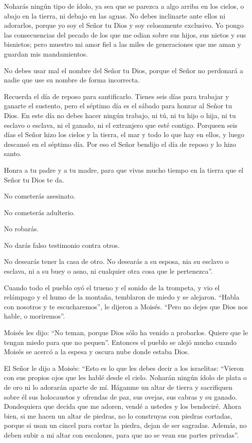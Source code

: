  Noharás ningún tipo de ídolo, ya sea que se parezca a algo
arriba en los cielos, o abajo en la tierra, ni debajo en las aguas.
 No debes inclinarte ante ellos ni adorarlos, porque yo soy
el Señor tu Dios y soy celosamente exclusivo. Yo pongo las consecuencias
del pecado de los que me odian sobre sus hijos, sus nietos y sus
bisnietos;  pero muestro mi amor fiel a las miles de
generaciones que me aman y guardan mis mandamientos.

 No debes usar mal el nombre del Señor tu Dios, porque el
Señor no perdonará a nadie que use su nombre de forma incorrecta.

 Recuerda el día de reposo para santificarlo. 
Tienes seis días para trabajar y ganarte el sustento,  pero
el séptimo día es el sábado para honrar al Señor tu Dios. En este día no
debes hacer ningún trabajo, ni tú, ni tu hijo o hija, ni tu esclavo o
esclava, ni el ganado, ni el extranjero que esté contigo. 
Porqueen seis días el Señor hizo los cielos y la tierra, el mar y todo
lo que hay en ellos, y luego descansó en el séptimo día. Por eso el
Señor bendijo el día de reposo y lo hizo santo.

 Honra a tu padre y a tu madre, para que vivas mucho tiempo
en la tierra que el Señor tu Dios te da.

 No cometerás asesinato.

 No cometerás adulterio.

 No robarás.

 No darás falso testimonio contra otros.

 No desearás tener la casa de otro. No desearás a su
esposa, nia su esclavo o esclava, ni a su buey o asno, ni cualquier otra
cosa que le pertenezca''.

 Cuando todo el pueblo oyó el trueno y el sonido de la
trompeta, y vio el relámpago y el humo de la montaña, temblaron de miedo
y se alejaron.  ``Habla con nosotros y te escucharemos'',
le dijeron a Moisés. ``Pero no dejes que Dios nos hable, o moriremos''.

 Moisés les dijo: ``No teman, porque Dios sólo ha venido a
probarlos. Quiere que le tengan miedo para que no pequen''.
 Entonces el pueblo se alejó mucho cuando Moisés se acercó
a la espesa y oscura nube donde estaba Dios.

 El Señor le dijo a Moisés: ``Esto es lo que les debes
decir a los israelitas: ``Vieron con sus propios ojos que les hablé
desde el cielo.  Noharán ningún ídolo de plata o de oro ni
lo adorarán aparte de mí.  Háganme un altar de tierra y
sacrifiquen sobre él sus holocaustos y ofrendas de paz, sus ovejas, sus
cabras y su ganado. Dondequiera que decida que me adoren, vendé a
ustedes y los bendeciré.  Ahora bien, si me hacen un altar
de piedras, no lo construyas con piedras cortadas, porque si usan un
cincel para cortar la piedra, dejan de ser sagradas. 
Además, no deben subir a mi altar con escalones, para que no se vean sus
partes privadas''.

